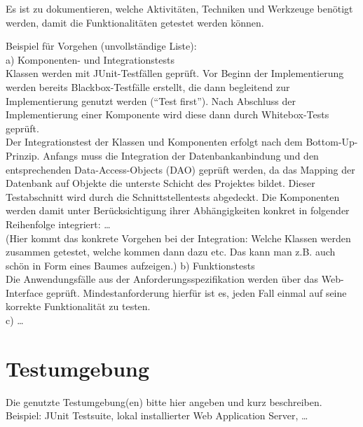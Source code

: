 Es ist zu dokumentieren, welche Aktivitäten, Techniken und Werkzeuge benötigt
werden, damit die Funktionalitäten getestet werden können.

Beispiel für Vorgehen (unvollständige Liste):\\
a) Komponenten- und Integrationstests\\
Klassen werden mit JUnit-Testfällen geprüft. Vor Beginn der Implementierung
werden bereits Blackbox-Testfälle erstellt, die dann begleitend zur
Implementierung genutzt werden ("`Test first"'). Nach Abschluss der
Implementierung einer Komponente wird diese dann durch Whitebox-Tests
geprüft.\\
Der Integrationstest der Klassen und Komponenten erfolgt nach dem
Bottom-Up-Prinzip. Anfangs muss die Integration der Datenbankanbindung und den
entsprechenden Data-Access-Objects (DAO) geprüft werden, da das Mapping der
Datenbank auf Objekte die unterste Schicht des Projektes bildet. Dieser
Testabschnitt wird durch die Schnittstellentests abgedeckt.
Die Komponenten werden damit unter Berücksichtigung ihrer Abhängigkeiten
konkret in folgender Reihenfolge integriert: \ldots\\
(Hier kommt das konkrete Vorgehen bei der Integration: Welche Klassen werden
zusammen getestet, welche kommen dann dazu etc. Das kann man z.B. auch schön in
Form eines Baumes aufzeigen.)
b) Funktionstests\\
Die Anwendungsfälle aus der Anforderungsspezifikation werden über das
Web-Interface geprüft. Mindestanforderung hierfür ist es, jeden Fall einmal auf
seine korrekte Funktionalität zu testen.\\
c) \ldots

\section{Testumgebung}
Die genutzte Testumgebung(en) bitte hier angeben und kurz beschreiben.\\
Beispiel: JUnit Testsuite, lokal installierter Web Application Server, \ldots

